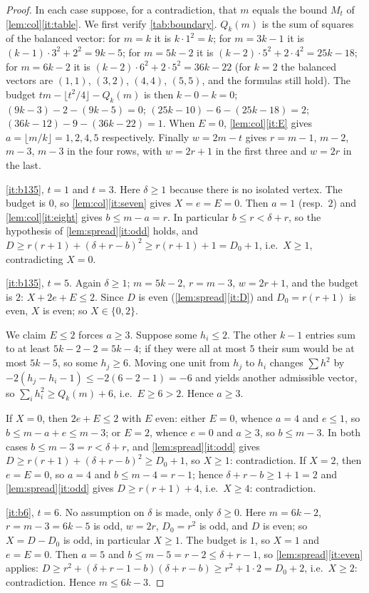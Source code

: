 \documentclass[11pt,a4paper]{article}
\theoremstyle{plain}
\theoremstyle{definition}
\theoremstyle{remark}
\newcommand{\fl}[1]{\lfloor #1\rfloor}
\begin{document}
\label{pf:boundary}
\lemboundary*
\begin{proof}
In each case suppose, for a contradiction, that $m$ equals the bound $M_t$ of \cref{lem:col}\ref{it:table}. We first verify \cref{tab:boundary}. $Q_k(m)$ is the sum of squares of the balanced vector: for $m=k$ it is $k\cdot1^2=k$; for $m=3k-1$ it is $(k-1)\cdot3^2+2^2=9k-5$; for $m=5k-2$ it is $(k-2)\cdot5^2+2\cdot4^2=25k-18$; for $m=6k-2$ it is $(k-2)\cdot6^2+2\cdot5^2=36k-22$ (for $k=2$ the balanced vectors are $(1,1)$, $(3,2)$, $(4,4)$, $(5,5)$, and the formulas still hold). The budget $tm-\fl{t^2/4}-Q_k(m)$ is then $k-0-k=0$; $(9k-3)-2-(9k-5)=0$; $(25k-10)-6-(25k-18)=2$; $(36k-12)-9-(36k-22)=1$. When $E=0$, \cref{lem:col}\ref{it:E} gives $a=\fl{m/k}=1,2,4,5$ respectively. Finally $w=2m-t$ gives $r=m-1$, $m-2$, $m-3$, $m-3$ in the four rows, with $w=2r+1$ in the first three and $w=2r$ in the last.

\ref{it:b135}, $t=1$ and $t=3$. Here $\delta\ge1$ because there is no isolated vertex. The budget is $0$, so \cref{lem:col}\ref{it:seven} gives $X=e=E=0$. Then $a=1$ (resp.\ $2$) and \cref{lem:col}\ref{it:eight} gives $b\le m-a=r$. In particular $b\le r<\delta+r$, so the hypothesis of \cref{lem:spread}\ref{it:odd} holds, and $D\ge r(r+1)+(\delta+r-b)^2\ge r(r+1)+1=D_0+1$, i.e.\ $X\ge1$, contradicting $X=0$.

\ref{it:b135}, $t=5$. Again $\delta\ge1$; $m=5k-2$, $r=m-3$, $w=2r+1$, and the budget is $2$: $X+2e+E\le2$. Since $D$ is even (\cref{lem:spread}\ref{it:D}) and $D_0=r(r+1)$ is even, $X$ is even; so $X\in\{0,2\}$.

We claim $E\le2$ forces $a\ge3$. Suppose some $h_i\le2$. The other $k-1$ entries sum to at least $5k-2-2=5k-4$; if they were all at most $5$ their sum would be at most $5k-5$, so some $h_j\ge6$. Moving one unit from $h_j$ to $h_i$ changes $\sum h^2$ by $-2(h_j-h_i-1)\le-2(6-2-1)=-6$ and yields another admissible vector, so $\sum_ih_i^2\ge Q_k(m)+6$, i.e.\ $E\ge6>2$. Hence $a\ge3$.

If $X=0$, then $2e+E\le2$ with $E$ even: either $E=0$, whence $a=4$ and $e\le1$, so $b\le m-a+e\le m-3$; or $E=2$, whence $e=0$ and $a\ge3$, so $b\le m-3$. In both cases $b\le m-3=r<\delta+r$, and \cref{lem:spread}\ref{it:odd} gives $D\ge r(r+1)+(\delta+r-b)^2\ge D_0+1$, so $X\ge1$: contradiction. If $X=2$, then $e=E=0$, so $a=4$ and $b\le m-4=r-1$; hence $\delta+r-b\ge1+1=2$ and \cref{lem:spread}\ref{it:odd} gives $D\ge r(r+1)+4$, i.e.\ $X\ge4$: contradiction.

\ref{it:b6}, $t=6$. No assumption on $\delta$ is made, only $\delta\ge0$. Here $m=6k-2$, $r=m-3=6k-5$ is odd, $w=2r$, $D_0=r^2$ is odd, and $D$ is even; so $X=D-D_0$ is odd, in particular $X\ge1$. The budget is $1$, so $X=1$ and $e=E=0$. Then $a=5$ and $b\le m-5=r-2\le\delta+r-1$, so \cref{lem:spread}\ref{it:even} applies: $D\ge r^2+(\delta+r-1-b)(\delta+r-b)\ge r^2+1\cdot2=D_0+2$, i.e.\ $X\ge2$: contradiction. Hence $m\le6k-3$.
\end{proof}
\end{document}
